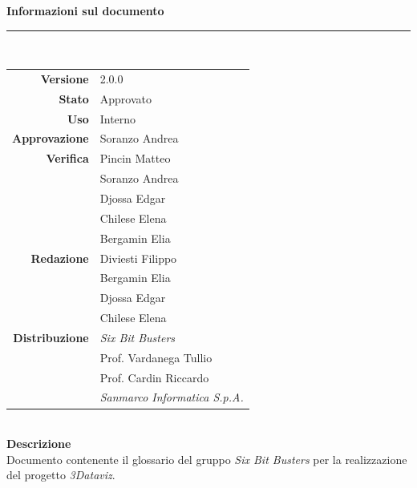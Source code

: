 \begin{titlepage}
\begin{center}
	\large \textbf{Informazioni sul documento} \\
	\rule{0.6\textwidth}{0.4pt}
	\\[0.5cm]
	\begin{tabular}{r|l}
		\textbf{Versione} & 2.0.0\\
		\textbf{Stato} & Approvato\\
		\textbf{Uso} & Interno\\                         
		\textbf{Approvazione} & Soranzo Andrea\\                      
		\textbf{Verifica} & Pincin Matteo \\ & Soranzo Andrea \\ & Djossa Edgar \\ & Chilese Elena\\ & Bergamin Elia\\                        
		\textbf{Redazione} & Diviesti Filippo\\ & Bergamin Elia \\ & Djossa Edgar\\ & Chilese Elena \\
		\textbf{Distribuzione} & \textit{Six Bit Busters} \\ & Prof. Vardanega Tullio \\ & Prof. Cardin Riccardo \\ & \textit{Sanmarco Informatica S.p.A.}
	\end{tabular}	
	\\[0.8cm]

	\large \textbf{Descrizione} \\
	Documento contenente il glossario del gruppo \textit{Six Bit Busters} per la realizzazione del progetto \textit{3Dataviz}.
	
	\end{center}
\end{titlepage}
